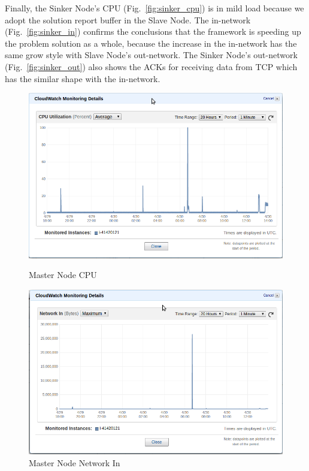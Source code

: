 Finally, the Sinker Node's CPU (Fig.~\ref{fig:sinker_cpu}) is in mild load because we adopt the solution report buffer in the Slave Node. The in-network (Fig.~\ref{fig:sinker_in}) confirms the conclusions that the framework is speeding up the problem solution as a whole, because the increase in the in-network has the same grow style with Slave Node's out-network. The Sinker Node's out-network (Fig.~\ref{fig:sinker_out}) also shows the ACKs for receiving data from TCP which has the similar shape with the in-network.

\begin{figure}[!htb]
  \includegraphics[width=\linewidth]{pics/master_cpu.png}
  \caption{Master Node CPU}\label{fig:master_cpu}
\endminipage\hfill
{}
  \includegraphics[width=\linewidth]{pics/master_network_in.png}
  \caption{Master Node Network In}\label{fig:master_in}
\endminipage\hfill
{}

\end{figure}
